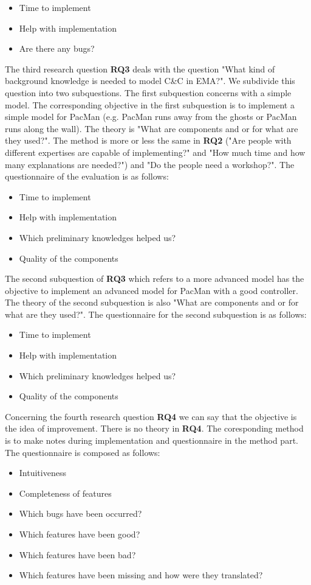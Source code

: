 \begin{itemize}
	\item Time to implement
	\item Help with implementation
	\item Are there any bugs?
\end{itemize}
The third research question \textbf{RQ3} deals with the question "What kind of background knowledge is needed to model C\&C in EMA?". We subdivide this question into two subquestions. The first subquestion concerns with a simple model. The corresponding objective in the first subquestion is to implement a simple model for PacMan (e.g. PacMan runs away from the ghosts or PacMan runs along the wall). The theory is "What are components and or for what are they used?". The method is more or less the same in \textbf{RQ2} ("Are people with different expertises are capable of implementing?" and "How much time and how many explanations are needed?") and "Do the people need a workshop?". The questionnaire of the evaluation is as follows:
\begin{itemize}
	\item Time to implement
	\item Help with implementation
	\item Which preliminary knowledges helped us?
	\item Quality of the components
\end{itemize}
The second subquestion of \textbf{RQ3} which refers to a more advanced model has the objective to implement an advanced model for PacMan with a good controller. The theory of the second subquestion is also "What are components and or for what are they used?". The questionnaire for the second subquestion is as follows:
\begin{itemize}
	\item Time to implement
	\item Help with implementation
	\item Which preliminary knowledges helped us?
	\item Quality of the components
\end{itemize}
Concerning the fourth research question \textbf{RQ4} we can say that the objective is the idea of improvement. There is no theory in \textbf{RQ4}. The coresponding method is to make notes during implementation and questionnaire in the method part. The questionnaire is composed as follows:
\begin{itemize}
	\item Intuitiveness
	\item Completeness of features
	\item Which bugs have been occurred?
	\item Which features have been good?
	\item Which features have been bad?
	\item Which features have been missing and how were they translated?
\end{itemize}